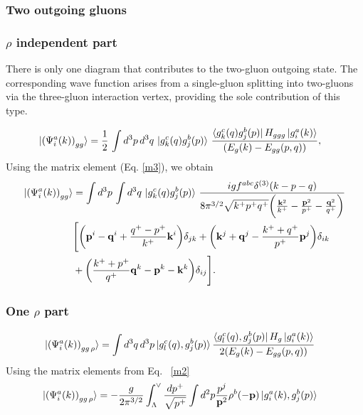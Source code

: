 \documentclass[a4paper,11pt]{article}
\def\v#1{\mathbf{#1}}
\begin{document}
\subsubsection{Two outgoing gluons}

\subsubsection*{$\rho$ independent part}
There is only one diagram that contributes to the two-gluon outgoing state. The corresponding wave function arises from a single-gluon splitting into two-gluons via the three-gluon interaction vertex, providing the sole contribution of this type. 

\begin{figure}[htbp]
    \centering
\end{figure}
\begin{align}
  \ket{ \left(\Psi^{a}_{i}(k) \right)_{gg} }
   & =
   \frac{1}{2}\, \int d^{3}p\, d^{3}q \, 
   \ket{g^{c}_{k}(q)g^{b}_{j}(p)}\, 
   \frac{\bra{g^{c}_{k}(q)g^{b}_{j}(p)} H_{ggg} \ket{g^{a}_{i}(k)}}{(E_{g}(k)-E_{gg}(p,q))},
   \end{align}  
Using the matrix element (Eq. \eqref{m3}), we obtain
   \begin{align}\label{rhoindep}
   \ket{ \left(\Psi^{a}_{i}(k) \right)_{gg} }
   & =  \int d^{3}p\,\int d^{3}q\,\ket{g^{c}_{k}(q)g^{b}_{j}(p)}\,\frac{igf^{abc}\delta^{(3)}(k-p-q)}{8\pi^{3/2}\sqrt{k^{+}p^{+}q^{+}}\bigg(\frac{\v{k}^{2}}{k^{+}}-\frac{\v{p}^{2}}{p^{+}}-\frac{\v{q}^{2}}{q^{+}}\bigg)}\notag \\ & \Bigg[\bigg(\v{p}^{i}-\v{q}^{i}+\frac{q^{+}-p^{+}}{k^{+}}\v{k}^{i}\bigg)\delta_{jk} +\bigg(\v{k}^{j}+\v{q}^{j}-\frac{k^{+}+q^{+}}{p^{+}}\v{p}^{j}\bigg)\delta_{ik}\notag \\ &  +\bigg(\frac{k^{+}+p^{+}}{q^{+}}\v{q}^{k}-\v{p}^{k}-\v{k}^{k}\bigg)\delta_{ij}\Bigg]. 
\end{align}
\subsubsection*{One $\rho$ part}
\begin{figure}[h]
\centering
{}
\end{figure}
\begin{align}
  \ket{ \left(\Psi^{a}_{i}(k) \right)_{gg\,\rho} }
   & = \int d^{3}q\, d^{3}p 
   \ket{g^{c}_{l}(q),g^{b}_{j}(p)}
 \frac{\bra{g^{c}_{l}(q),g^{b}_{j}(p)}H_{g}\ket{g^{a}_{i}(k)}}{2(E_{g}(k)-E_{gg}(p,q))}
\end{align}
Using the matrix elements from Eq.~ \eqref{m2}
\begin{align}
 \ket{ \left(\Psi^{a}_{i}(k) \right)_{gg\,\rho} }   & = - \frac{g}{2\pi^{3/2}} \int_{\Lambda}^{\vee} \frac{dp^+}{\sqrt{p^+}}
   \int d^2 p \frac{p^j}{\v{p}^2} \rho^b(-\v{p})
   \ket{g^{a}_{i}(k),g^{b}_{j}(p)}
\end{align}
\end{document}
